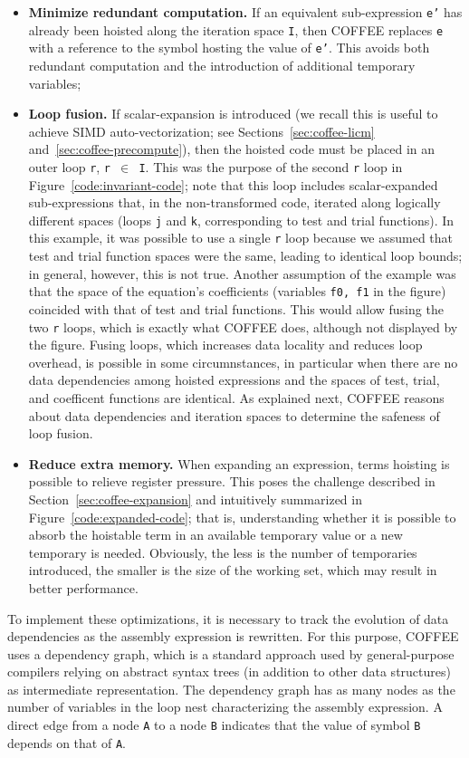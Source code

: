 \begin{itemize}
\item \textbf{Minimize redundant computation.} If an equivalent sub-expression \texttt{e'} has already been hoisted along the iteration space \texttt{I}, then COFFEE replaces \texttt{e} with a reference to the symbol hosting the value of \texttt{e'}. This avoids both redundant computation and the introduction of additional temporary variables;
\item \textbf{Loop fusion.} If scalar-expansion is introduced (we recall this is useful to achieve SIMD auto-vectorization; see Sections~\ref{sec:coffee-licm} and~\ref{sec:coffee-precompute}), then the hoisted code must be placed in an outer loop \texttt{r}, \texttt{r $\in$ I}. This was the purpose of the second \texttt{r} loop in Figure~\ref{code:invariant-code}; note that this loop includes scalar-expanded sub-expressions that, in the non-transformed code, iterated along logically different spaces (loops \texttt{j} and \texttt{k}, corresponding to test and trial functions). In this example, it was possible to use a single \texttt{r} loop because we assumed that test and trial function spaces were the same, leading to identical loop bounds; in general, however, this is not true. Another assumption of the example was that the space of the equation's coefficients (variables \texttt{f0, f1} in the figure) coincided with that of test and trial functions. This would allow fusing the two \texttt{r} loops, which is exactly what COFFEE does, although not displayed by the figure. Fusing loops, which increases data locality and reduces loop overhead, is possible in some circumnstances, in particular when there are no data dependencies among hoisted expressions and the spaces of test, trial, and coefficent functions are identical. As explained next, COFFEE reasons about data dependencies and iteration spaces to determine the safeness of loop fusion.
\item \textbf{Reduce extra memory.} When expanding an expression, terms hoisting is possible to relieve register pressure. This poses the challenge described in Section~\ref{sec:coffee-expansion} and intuitively summarized in Figure~\ref{code:expanded-code}; that is, understanding whether it is possible to absorb the hoistable term in an available temporary value or a new temporary is needed. Obviously, the less is the number of temporaries introduced, the smaller is the size of the working set, which may result in better performance.
\end{itemize}
To implement these optimizations, it is necessary to track the evolution of data dependencies as the assembly expression is rewritten. For this purpose, COFFEE uses a dependency graph, which is a standard approach used by general-purpose compilers relying on abstract syntax trees (in addition to other data structures) as intermediate representation. The dependency graph has as many nodes as the number of variables in the loop nest characterizing the assembly expression. A direct edge from a node \texttt{A} to a node \texttt{B} indicates that the value of symbol \texttt{B} depends on that of \texttt{A}. 

